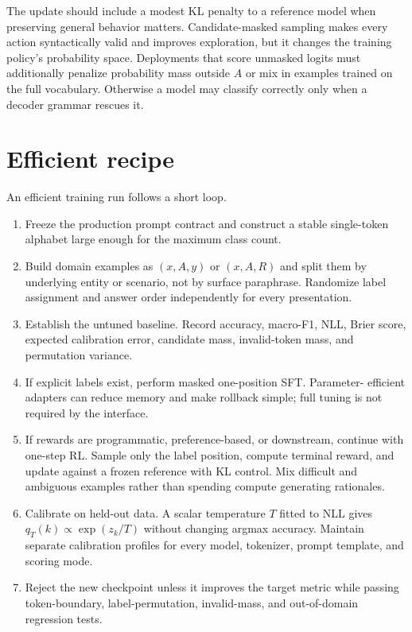 \documentclass[11pt]{article}
\begin{document}
The update should include a modest KL penalty to a reference model when
preserving general behavior matters.  Candidate-masked sampling makes every
action syntactically valid and improves exploration, but it changes the
training policy's probability space.  Deployments that score unmasked logits
must additionally penalize probability mass outside $A$ or mix in examples
trained on the full vocabulary.  Otherwise a model may classify correctly
only when a decoder grammar rescues it.

\section{Efficient recipe}

An efficient training run follows a short loop.

\begin{enumerate}
\item Freeze the production prompt contract and construct a stable
single-token alphabet large enough for the maximum class count.
\item Build domain examples as $(x,A,y)$ or $(x,A,R)$ and split them by
underlying entity or scenario, not by surface paraphrase.  Randomize label
assignment and answer order independently for every presentation.
\item Establish the untuned baseline.  Record accuracy, macro-F1, NLL, Brier
score, expected calibration error, candidate mass, invalid-token mass, and
permutation variance.
\item If explicit labels exist, perform masked one-position SFT.  Parameter-
efficient adapters can reduce memory and make rollback simple; full tuning is
not required by the interface.
\item If rewards are programmatic, preference-based, or downstream, continue
with one-step RL.  Sample only the label position, compute terminal reward,
and update against a frozen reference with KL control.  Mix difficult and
ambiguous examples rather than spending compute generating rationales.
\item Calibrate on held-out data.  A scalar temperature $T$ fitted to NLL
gives $q_T(k)\propto\exp(z_k/T)$ without changing argmax accuracy.  Maintain
separate calibration profiles for every model, tokenizer, prompt template,
and scoring mode.
\item Reject the new checkpoint unless it improves the target metric while
passing token-boundary, label-permutation, invalid-mass, and out-of-domain
regression tests.
\end{enumerate}
\end{document}

